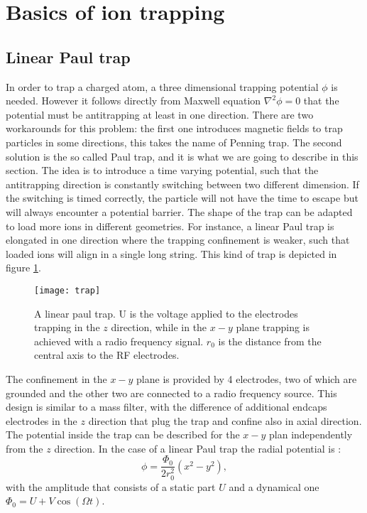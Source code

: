 \section{Basics of ion trapping}
\subsection{Linear Paul trap}
In order to trap a charged atom, a three dimensional trapping potential $\phi$ is needed. However it follows directly from Maxwell equation $\nabla^2 \phi = 0$ that the potential must be antitrapping at least in one direction. There are two workarounds for this problem: the first one introduces magnetic fields to trap particles in some directions, this takes the name of Penning trap. The second solution is the so called Paul trap, and it is what we are going to describe in this section. The idea is to introduce a time varying potential, such that the antitrapping direction is constantly switching between two  different dimension. If the switching is timed correctly, the particle will not have the time to escape but will always encounter a potential barrier.
The shape of the trap can be adapted to load more ions in different geometries. For instance, a linear Paul trap is elongated in one direction where the trapping confinement is weaker, such that loaded ions will align in a single long string. This kind of trap is depicted in figure \ref{trap}.
\begin{figure}
\centering
\texttt{[image: trap]}
\caption{A linear paul trap. U is the voltage applied to the electrodes trapping in the $z$ direction, while in the $x-y$ plane trapping is achieved with a radio frequency signal. $r_0$ is the distance from the central axis to the RF electrodes.}
\label{trap}
\end{figure}
The confinement in the $x-y$ plane is provided by 4 electrodes, two of which are grounded and the other two are connected to a radio frequency source. This design is similar to a mass filter, with the difference of additional endcaps electrodes in the $z$ direction that plug the trap and confine also in axial direction.\\
The potential inside the trap can be described for the $x-y$ plan independently from the $z$ direction. In the case of a linear Paul trap the radial potential is \cite{traptheory}:
\begin{equation}
\phi  = \frac{\Phi_0}{2r_0^2}\left(x^2 - y^2\right),
\end{equation}
with the amplitude that consists of a static part $U$ and a dynamical one $\Phi_0 = U + V \cos(\Omega t)$.

